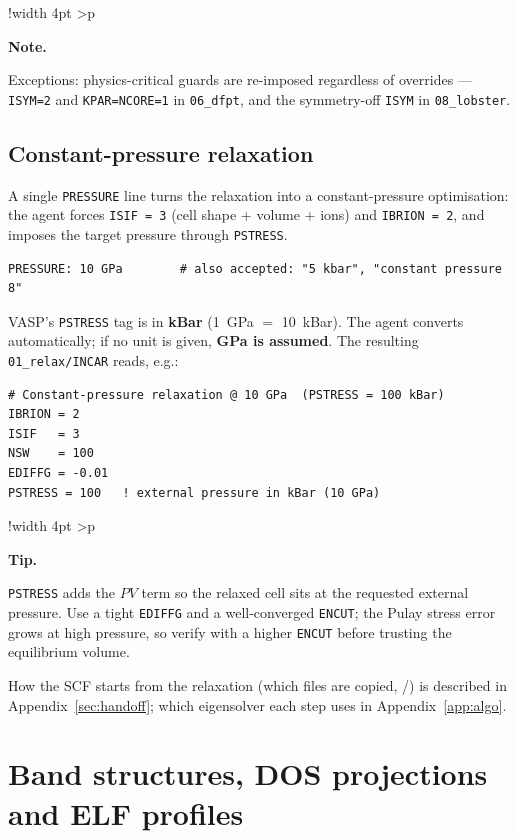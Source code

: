 \documentclass[11pt,a4paper]{scrartcl}
\newlength{\boxwidth}
\newenvironment{notebox}{%
  \par\vspace{6pt}%
  \setlength{\tabcolsep}{5pt}%
  \setlength{\boxwidth}{\dimexpr\linewidth - 4pt - 2\tabcolsep}%
  \noindent\begin{tabular}{!{\color{notebar}\vrule width 4pt}%
      >{\columncolor{notebg}}p{\boxwidth}}%
  \rule{0pt}{11pt}\textbf{\textcolor{notebar}{Note.}}\enspace\ignorespaces%
}{%
  \rule[-4pt]{0pt}{4pt}%
  \end{tabular}\par\vspace{6pt}%
}
\newenvironment{tipbox}{%
  \par\vspace{6pt}%
  \setlength{\tabcolsep}{5pt}%
  \setlength{\boxwidth}{\dimexpr\linewidth - 4pt - 2\tabcolsep}%
  \noindent\begin{tabular}{!{\color{tipbar}\vrule width 4pt}%
      >{\columncolor{tipbg}}p{\boxwidth}}%
  \rule{0pt}{11pt}\textbf{\textcolor{tipbar}{Tip.}}\enspace\ignorespaces%
}{%
  \rule[-4pt]{0pt}{4pt}%
  \end{tabular}\par\vspace{6pt}%
}
\newcommand{\cmd}[1]{\texttt{\detokenize{#1}}}
\begin{document}
\begin{notebox}
Exceptions: physics-critical guards are re-imposed regardless of
overrides --- \texttt{ISYM=2} and \texttt{KPAR=NCORE=1} in
\texttt{06\_dfpt}, and the symmetry-off \texttt{ISYM} in
\texttt{08\_lobster}.
\end{notebox}

\subsection{Constant-pressure relaxation}
\label{sec:pressure}

A single \texttt{PRESSURE} line turns the relaxation into a
constant-pressure optimisation: the agent forces \texttt{ISIF = 3} (cell
shape + volume + ions) and \texttt{IBRION = 2}, and imposes the target
pressure through \texttt{PSTRESS}.

\begin{lstlisting}
PRESSURE: 10 GPa        # also accepted: "5 kbar", "constant pressure 8"
\end{lstlisting}

VASP's \texttt{PSTRESS} tag is in \textbf{kBar} (1~GPa $=$ 10~kBar).  The
agent converts automatically; if no unit is given, \textbf{GPa is
assumed}.  The resulting \texttt{01\_relax/INCAR} reads, e.g.:

\begin{lstlisting}
# Constant-pressure relaxation @ 10 GPa  (PSTRESS = 100 kBar)
IBRION = 2
ISIF   = 3
NSW    = 100
EDIFFG = -0.01
PSTRESS = 100   ! external pressure in kBar (10 GPa)
\end{lstlisting}

\begin{tipbox}
\texttt{PSTRESS} adds the $PV$ term so the relaxed cell sits at the
requested external pressure.  Use a tight \texttt{EDIFFG} and a
well-converged \texttt{ENCUT}; the Pulay stress error grows at high
pressure, so verify with a higher \texttt{ENCUT} before trusting the
equilibrium volume.
\end{tipbox}

How the SCF starts from the relaxation (which files are copied, \cmd{ISTART}/\cmd{ICHARG}) is described in Appendix~\ref{sec:handoff}; which eigensolver each step uses in Appendix~\ref{app:algo}.

\section{Band structures, DOS projections and ELF profiles}
\label{sec:spectra}
\end{document}
